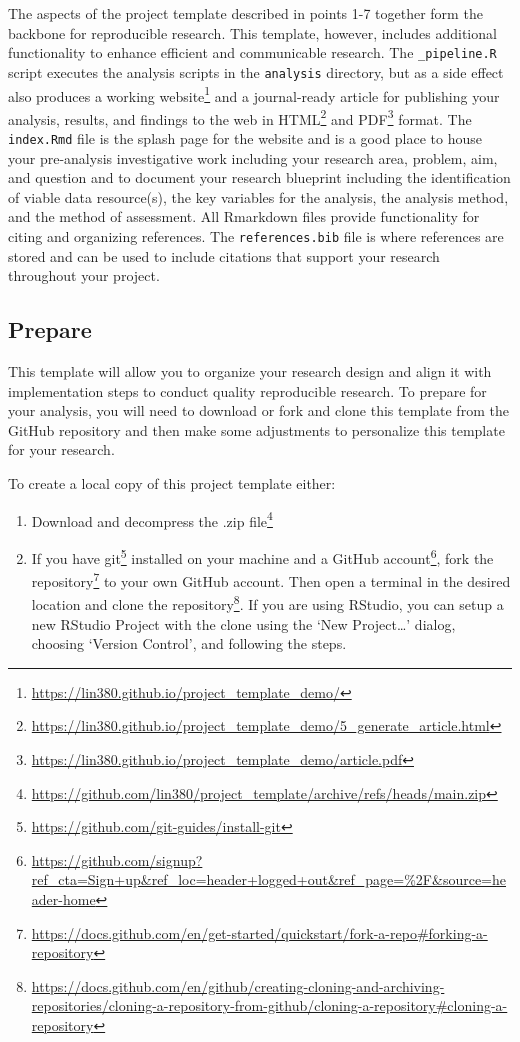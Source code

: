 \documentclass[
  letterpaper,
]{scrbook}
\providecommand{\tightlist}{%
  \setlength{\itemsep}{0pt}\setlength{\parskip}{0pt}}\usepackage{longtable,booktabs,array}
\DeclareRobustCommand{\href}[2]{#2\footnote{\url{#1}}}
\begin{document}
The aspects of the project template described in points 1-7 together
form the backbone for reproducible research. This template, however,
includes additional functionality to enhance efficient and communicable
research. The \texttt{\_pipeline.R} script executes the analysis scripts
in the \texttt{analysis} directory, but as a side effect also produces
\href{https://lin380.github.io/project_template_demo/}{a working
website} and a journal-ready article for publishing your analysis,
results, and findings to the web in
\href{https://lin380.github.io/project_template_demo/5_generate_article.html}{HTML}
and
\href{https://lin380.github.io/project_template_demo/article.pdf}{PDF}
format. The \texttt{index.Rmd} file is the splash page for the website
and is a good place to house your pre-analysis investigative work
including your research area, problem, aim, and question and to document
your research blueprint including the identification of viable data
resource(s), the key variables for the analysis, the analysis method,
and the method of assessment. All Rmarkdown files provide functionality
for citing and organizing references. The \texttt{references.bib} file
is where references are stored and can be used to include citations that
support your research throughout your project.

\hypertarget{prepare}{%
\subsection{Prepare}\label{prepare}}

This template will allow you to organize your research design and align
it with implementation steps to conduct quality reproducible research.
To prepare for your analysis, you will need to download or fork and
clone this template from the GitHub repository and then make some
adjustments to personalize this template for your research.

To create a local copy of this project template either:

\begin{enumerate}
\def\labelenumi{\arabic{enumi}.}
\tightlist
\item
  Download and decompress the
  \href{https://github.com/lin380/project_template/archive/refs/heads/main.zip}{.zip
  file}
\item
  If you have \href{https://github.com/git-guides/install-git}{git}
  installed on your machine and a
  \href{https://github.com/signup?ref_cta=Sign+up\&ref_loc=header+logged+out\&ref_page=\%2F\&source=header-home}{GitHub
  account},
  \href{https://docs.github.com/en/get-started/quickstart/fork-a-repo\#forking-a-repository}{fork
  the repository} to your own GitHub account. Then open a terminal in
  the desired location and
  \href{https://docs.github.com/en/github/creating-cloning-and-archiving-repositories/cloning-a-repository-from-github/cloning-a-repository\#cloning-a-repository}{clone
  the repository}. If you are using RStudio, you can setup a new RStudio
  Project with the clone using the `New Project\ldots{}' dialog,
  choosing `Version Control', and following the steps.
\end{enumerate}
\end{document}
